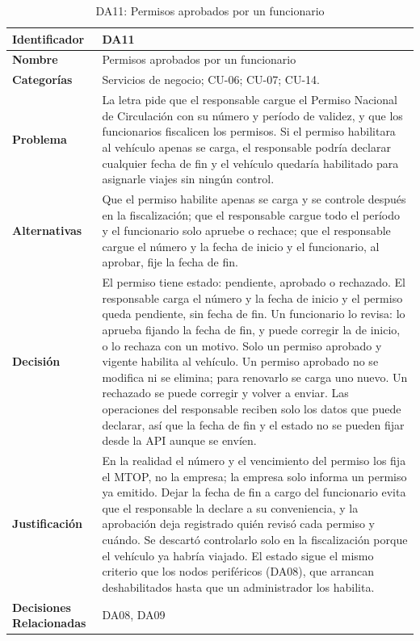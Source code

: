 \begin{table}[H]
    \small
    \centering
    \caption{DA11: Permisos aprobados por un funcionario}
    \label{tab:da11}
    \begin{tabular}{|p{4.1cm}|p{11.7cm}|}
        \hline
            \textbf{Identificador} & DA11 \\
        \hline
            \textbf{Nombre} & Permisos aprobados por un funcionario \\
        \hline
            \textbf{Categorías} & Servicios de negocio; CU-06; CU-07; CU-14. \\
        \hline
            \textbf{Problema} & La letra pide que el responsable cargue el Permiso Nacional de Circulación con su número y período de validez, y que los funcionarios fiscalicen los permisos. Si el permiso habilitara al vehículo apenas se carga, el responsable podría declarar cualquier fecha de fin y el vehículo quedaría habilitado para asignarle viajes sin ningún control. \\
        \hline
            \textbf{Alternativas} & Que el permiso habilite apenas se carga y se controle después en la fiscalización; que el responsable cargue todo el período y el funcionario solo apruebe o rechace; que el responsable cargue el número y la fecha de inicio y el funcionario, al aprobar, fije la fecha de fin. \\
        \hline
            \textbf{Decisión} & El permiso tiene estado: pendiente, aprobado o rechazado. El responsable carga el número y la fecha de inicio y el permiso queda pendiente, sin fecha de fin. Un funcionario lo revisa: lo aprueba fijando la fecha de fin, y puede corregir la de inicio, o lo rechaza con un motivo. Solo un permiso aprobado y vigente habilita al vehículo. Un permiso aprobado no se modifica ni se elimina; para renovarlo se carga uno nuevo. Un rechazado se puede corregir y volver a enviar. Las operaciones del responsable reciben solo los datos que puede declarar, así que la fecha de fin y el estado no se pueden fijar desde la API aunque se envíen. \\
        \hline
            \textbf{Justificación} & En la realidad el número y el vencimiento del permiso los fija el MTOP, no la empresa; la empresa solo informa un permiso ya emitido. Dejar la fecha de fin a cargo del funcionario evita que el responsable la declare a su conveniencia, y la aprobación deja registrado quién revisó cada permiso y cuándo. Se descartó controlarlo solo en la fiscalización porque el vehículo ya habría viajado. El estado sigue el mismo criterio que los nodos periféricos (DA08), que arrancan deshabilitados hasta que un administrador los habilita. \\
        \hline
            \textbf{Decisiones Relacionadas} & DA08, DA09 \\
        \hline
    \end{tabular}
\end{table}

